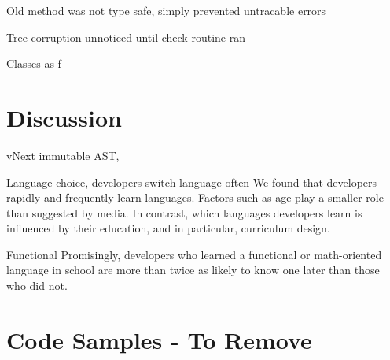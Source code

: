 \documentclass[twoside,openright]{uva-bachelor-thesis}
\newcommand{\includecode}[3]{\begin{figure}\end{figure}}
\begin{document}
		Old method was not type safe, simply prevented untracable errors
		
		Tree corruption unnoticed until check routine ran
		
		Classes as f
	
\chapter{Discussion}
	vNext immutable AST, 
	
	Language choice, developers switch language often
		We found that developers rapidly and frequently learn
		languages. Factors such as age play a smaller role than suggested
		by media. In contrast, which languages developers
		learn is influenced by their education, and in particular, curriculum
		design.
		
	Functional
		Promisingly, developers who learned a functional or	math-oriented language in school are more than twice as likely to know one later than those who did not.
		
\chapter{Code Samples - To Remove}
	\includecode{c_node_union.c}{old-arch:union}{Sample child node and attribute union structures for node}
	\includecode{c_init_trav.c}{old-arch:start-trav}{Starting a traversal}
	\includecode{c_trav_sons.c}{old-arch:switch-trav}{Excerpt from catch-all switch construct}
	\includecode{ast1.cs}{reflection-base-simple}{Using reflection to retrieve marked properties from a derived class}
	\includecode{ast2.cs}{reflection-base}{Updated code for the base class and attribute}
	\includecode{walkabout.java}{walkabout}{Walkabout algorithm by \citeauthor{palsberg1998essence}}
	\includecode{viewonly.cs}{readonly}{View-only visitor}
	\includecode{gen_visitor.cs}{gen-visit}{Generalized visitor}
	\includecode{lambda_visitor.cs}{lambda}{Lambda-based visitor}	



\end{document}
